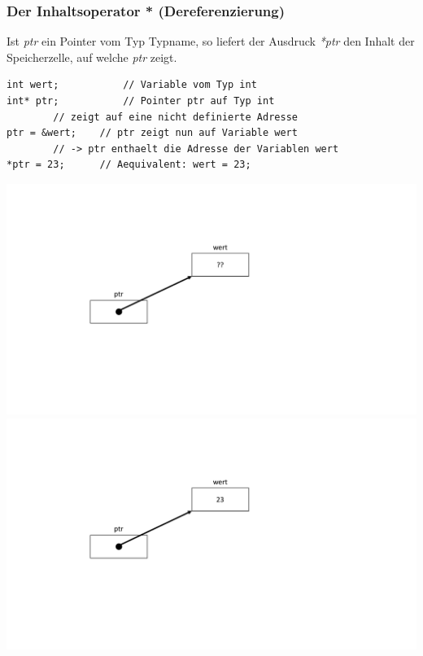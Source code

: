 \subsubsection{Der Inhaltsoperator * \textbf{(Dereferenzierung)}}
Ist \emph{ptr} ein Pointer vom Typ Typname, so liefert der Ausdruck \emph{*ptr} den Inhalt der Speicherzelle, auf welche \emph{ptr} zeigt.\\
\noindent
\begin{minipage}{0.65\linewidth}
\begin{lstlisting}
int wert;			// Variable vom Typ int
int* ptr;			// Pointer ptr auf Typ int
		// zeigt auf eine nicht definierte Adresse
ptr = &wert;	// ptr zeigt nun auf Variable wert
		// -> ptr enthaelt die Adresse der Variablen wert
*ptr = 23;		// Aequivalent: wert = 23;
\end{lstlisting}
\end{minipage}
\hspace{0.01\linewidth}
\begin{minipage}{0.2\linewidth}
	\includegraphics[width=\linewidth]{images/pointer7.pdf}
	\includegraphics[width=\linewidth]{images/pointer8.pdf}
\end{minipage}
\vfill
\pagebreak\newpage

